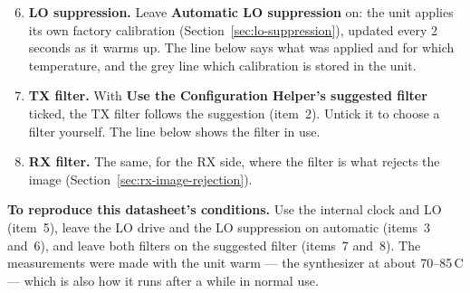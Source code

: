 \par\medskip\noindent\begin{minipage}{\linewidth}\centering
{}
\label{fig:gui-tx}
\end{minipage}\par
\begin{enumerate}
\setcounter{enumi}{5}
\setlength{\itemsep}{2pt}
\item \textbf{LO suppression.} Leave \textbf{Automatic LO suppression} on: the unit applies its own factory
  calibration (Section~\ref{sec:lo-suppression}), updated every 2\,seconds as it warms up. The line below says what was
  applied and for which temperature, and the grey line which calibration is stored in the unit.
\item \textbf{TX filter.} With \textbf{Use the Configuration Helper's suggested filter} ticked, the TX filter follows
  the suggestion (item~2). Untick it to choose a filter yourself. The line below shows the filter in use.
\end{enumerate}

\par\medskip\noindent\begin{minipage}{\linewidth}\centering
{}
\label{fig:gui-rx}
\end{minipage}\par
\begin{enumerate}
\setcounter{enumi}{7}
\item \textbf{RX filter.} The same, for the RX side, where the filter is what rejects the image
  (Section~\ref{sec:rx-image-rejection}).
\end{enumerate}

\textbf{To reproduce this datasheet's conditions.} Use the internal clock and LO (item~5), leave the LO drive and the LO
suppression on automatic (items~3 and~6), and leave both filters on the suggested filter (items~7 and~8). The
measurements were made with the unit warm --- the synthesizer at about 70--85\,\textdegree C --- which is
also how it runs after a while in normal use.

